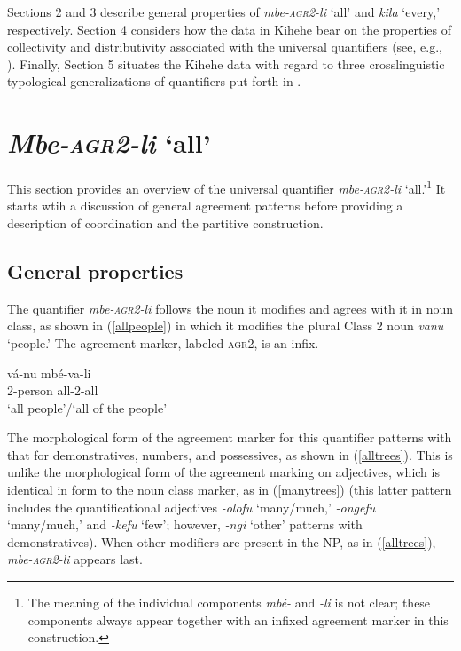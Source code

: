 \documentclass[letterpaper, 12pt]{article}
\begin{document}
Sections 2 and 3 describe general properties of \textit{mbe-\textsc{agr2}-li} `all' and \textit{kila} `every,' respectively. Section 4 considers how the data in Kihehe bear on the properties of collectivity and distributivity associated with the universal quantifiers (see, e.g., ). Finally, Section 5 situates the Kihehe data with regard to three crosslinguistic typological generalizations of quantifiers put forth in . 


\section{\emph{Mbe-\textsc{agr2}-li} `all'}

This section provides an overview of the universal quantifier \emph{mbe-\textsc{agr2}-li} `all.'\footnote{The meaning of the individual components \textit{mb\'e-} and \textit{-li} is not clear; these components always appear together with an infixed agreement marker in this construction.} It starts wtih a discussion of general agreement patterns before providing a description of coordination and the partitive construction. 

\subsection{General properties}

 The quantifier \emph{mbe-\textsc{agr2}-li} follows the noun it modifies and agrees with it in noun class, as shown in (\ref{allpeople}) in which it modifies the plural Class 2 noun \textit{vanu} `people.' The agreement marker, labeled \textsc{agr2}, is an infix.  

\begin{exe}
\ex \gll v\'a-nu mb\'e-va-li \label{allpeople} \\
2-person all-2-all \\
`all people'/`all of the people'\footnotemark \\

\end{exe}

The morphological form of the agreement marker for this quantifier patterns with that for demonstratives, numbers, and possessives, as shown in (\ref{alltrees}).  This is unlike the morphological form of the agreement marking on adjectives, which is identical in form to the noun class marker, as in (\ref{manytrees}) (this latter pattern includes the quantificational adjectives \textit{-olofu} `many/much,' \textit{-ongefu} `many/much,' and \textit{-kefu} `few'; however, \textit{-ngi} `other' patterns with demonstratives). When other modifiers are present in the NP, as in (\ref{alltrees}),   \textit{mbe-\textsc{agr2}-li} appears last.
\end{document}

